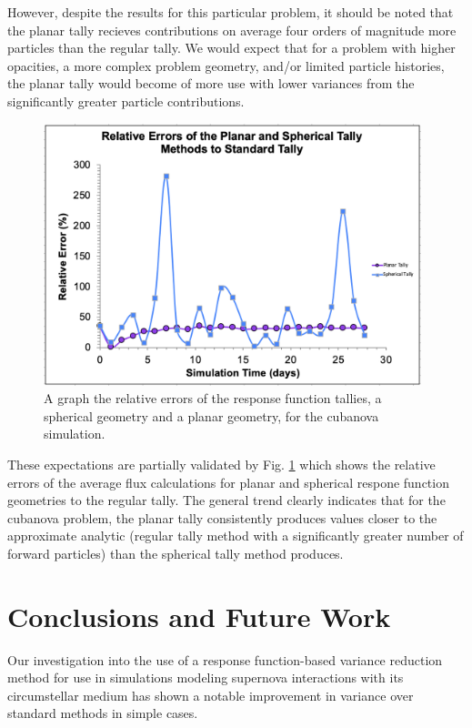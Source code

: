 \documentclass[]{article}
\begin{document}
		However, despite the results for this particular problem, it should be noted that the planar tally recieves contributions on average four orders of magnitude more particles than the regular tally. We would expect that for a problem with higher opacities, a more complex problem geometry, and/or limited particle histories, the planar tally would become of more use with lower variances from the significantly greater particle contributions. 

		\begin{figure} [h!]
			\centering
			\includegraphics[height=3in]{Figures/relative_errors.png}
			\caption{A graph the relative errors of the response function tallies, a spherical geometry and a planar geometry, for the cubanova simulation. }
			\label{fig:relative_errors}
		\end{figure}
	
		These expectations are partially validated by Fig. \ref{fig:relative_errors} which shows the relative errors of the average flux calculations for planar and spherical respone function geometries to the regular tally. The general trend clearly indicates that for the cubanova problem, the planar tally consistently produces values closer to the approximate analytic (regular tally method with a significantly greater number of forward particles) than the spherical tally method produces.

\section{Conclusions and Future Work}
Our investigation into the use of a response function-based variance reduction method for use in simulations modeling supernova interactions with its circumstellar medium has shown a notable improvement in variance over standard methods in simple cases. 
\end{document}
